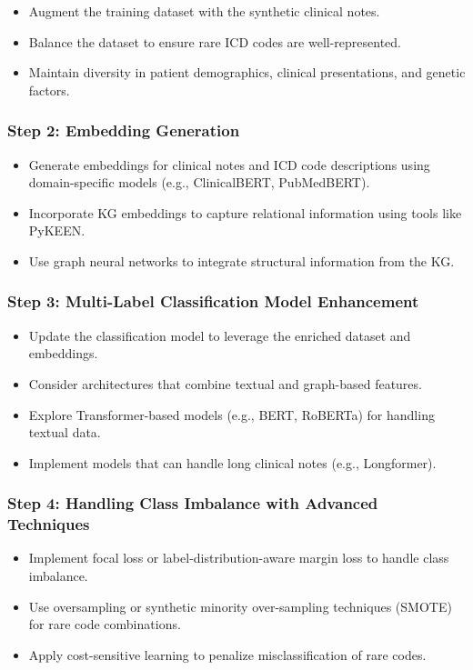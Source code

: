 \documentclass[12pt, a4paper]{article}
\begin{document}
\begin{itemize}
    \item Augment the training dataset with the synthetic clinical notes.
    \item Balance the dataset to ensure rare ICD codes are well-represented.
    \item Maintain diversity in patient demographics, clinical presentations, and genetic factors.
\end{itemize}

\subsubsection{Step 2: Embedding Generation}

\begin{itemize}
    \item Generate embeddings for clinical notes and ICD code descriptions using domain-specific models (e.g., ClinicalBERT, PubMedBERT).
    \item Incorporate KG embeddings to capture relational information using tools like PyKEEN.
    \item Use graph neural networks to integrate structural information from the KG.
\end{itemize}

\subsubsection{Step 3: Multi-Label Classification Model Enhancement}

\begin{itemize}
    \item Update the classification model to leverage the enriched dataset and embeddings.
    \item Consider architectures that combine textual and graph-based features.
    \item Explore Transformer-based models (e.g., BERT, RoBERTa) for handling textual data.
    \item Implement models that can handle long clinical notes (e.g., Longformer).
\end{itemize}

\subsubsection{Step 4: Handling Class Imbalance with Advanced Techniques}

\begin{itemize}
    \item Implement focal loss or label-distribution-aware margin loss to handle class imbalance.
    \item Use oversampling or synthetic minority over-sampling techniques (SMOTE) for rare code combinations.
    \item Apply cost-sensitive learning to penalize misclassification of rare codes.
\end{itemize}
\end{document}
